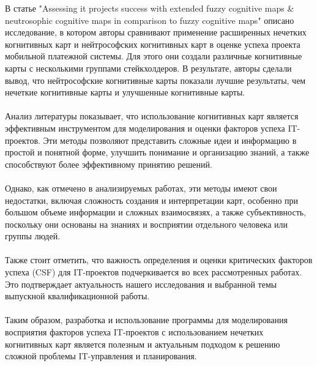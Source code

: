 \documentclass{article}
\begin{document}
    В статье "{}Assessing it projects success with extended fuzzy cognitive maps \& neutrosophic cognitive maps in comparison to fuzzy cognitive maps"{} \cite{litlink20} описано исследование, в котором авторы сравнивают применение расширенных нечетких когнитивных карт и нейтрософских когнитивных карт в оценке успеха проекта мобильной платежной системы. Для этого они создали различные когнитивные карты с несколькими группами стейкхолдеров. В результате, авторы сделали вывод, что нейтрософские когнитивные карты показали лучшие результаты, чем нечеткие когнитивные карты и улучшенные когнитивные карты.\\
    ~\\
    Анализ литературы показывает, что использование когнитивных карт является эффективным инструментом для моделирования и оценки факторов успеха IT-проектов. Эти методы позволяют представить сложные идеи и информацию в простой и понятной форме, улучшить понимание и организацию знаний, а также способствуют более эффективному принятию решений.\\
    ~\\
    Однако, как отмечено в анализируемых работах, эти методы имеют свои недостатки, включая сложность создания и интерпретации карт, особенно при большом объеме информации и сложных взаимосвязях, а также субъективность, поскольку они основаны на знаниях и восприятии отдельного человека или группы людей.\\
    ~\\
    Также стоит отметить, что важность определения и оценки критических факторов успеха (CSF) для IT-проектов подчеркивается во всех рассмотренных работах. Это подтверждает актуальность нашего исследования и выбранной темы выпускной квалификационной работы.\\
    ~\\
    Таким образом, разработка и использование программы для моделирования восприятия факторов успеха IT-проектов с использованием нечетких когнитивных карт является полезным и актуальным подходом к решению сложной проблемы IT-управления и планирования.\\
\end{document}
